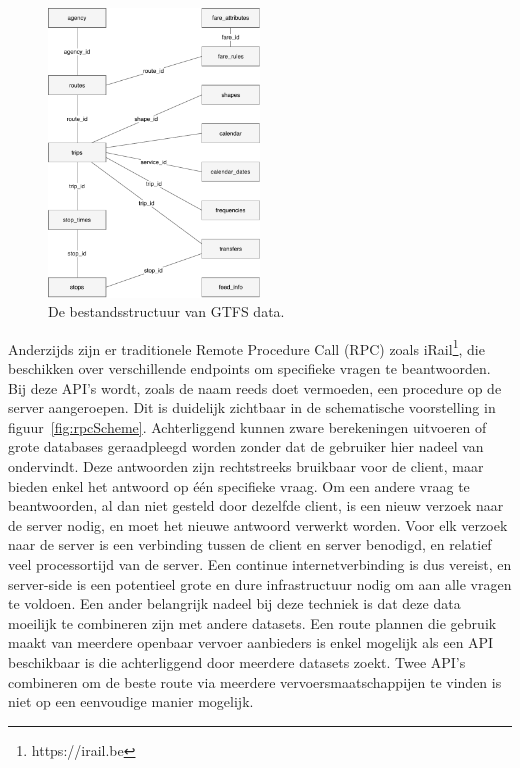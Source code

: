 \begin{figure}
	\centering
	\includegraphics[width=0.5\textwidth]{images/GTFS_scheme.pdf}
		\caption[GTFS structuur]{De bestandsstructuur van GTFS data.}
	\label{fig:gtfsScheme}
\end{figure}
 
Anderzijds zijn er traditionele Remote Procedure Call (RPC) zoals iRail\footnote{https://irail.be}, die beschikken over verschillende endpoints om specifieke vragen te beantwoorden. Bij deze API's wordt, zoals de naam reeds doet vermoeden, een procedure op de server aangeroepen. Dit is duidelijk zichtbaar in de schematische voorstelling in figuur~\ref{fig:rpcScheme}. Achterliggend kunnen zware berekeningen uitvoeren of grote databases geraadpleegd worden zonder dat de gebruiker hier nadeel van ondervindt. Deze antwoorden zijn rechtstreeks bruikbaar voor de client, maar bieden enkel het antwoord op één specifieke vraag. Om een andere vraag te beantwoorden, al dan niet gesteld door dezelfde client, is een nieuw verzoek naar de server nodig, en moet het nieuwe antwoord verwerkt worden. Voor elk verzoek naar de server is een verbinding tussen de client en server benodigd, en relatief veel processortijd van de server. Een continue internetverbinding is dus vereist, en server-side is een potentieel grote en dure infrastructuur nodig om aan alle vragen te voldoen. Een ander belangrijk nadeel bij deze techniek is dat deze data moeilijk te combineren zijn met andere datasets. Een route plannen die gebruik maakt van meerdere openbaar vervoer aanbieders is enkel mogelijk als een API beschikbaar is die achterliggend door meerdere datasets zoekt. Twee API's combineren om de beste route via meerdere vervoersmaatschappijen te vinden is niet op een eenvoudige manier mogelijk.

